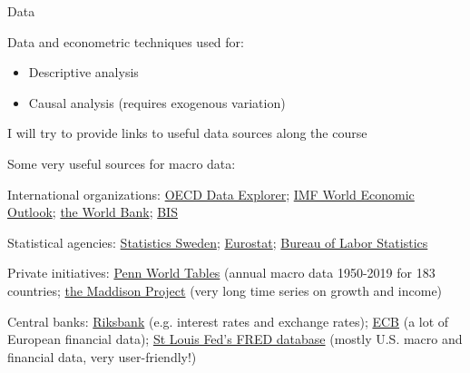 \documentclass[10pt,handout]{beamer}
\begin{document}
\begin{frame}{Data}
\begin{itemize}
    \small{
    \item Data and econometric techniques used for:
    \begin{itemize}
        \item Descriptive analysis\smallskip
        \item Causal analysis (requires exogenous variation)\medskip
    \end{itemize}

    \item I will try to provide links to useful data sources along the course \medskip
    
    \item Some very useful sources for macro data:
    }
    \begin{itemize}
    \footnotesize{
        \item International organizations: \href{https://data-explorer.oecd.org/}{OECD Data Explorer}; \href{https://www.imf.org/en/Publications/SPROLLs/world-economic-outlook-databases}{IMF World Economic Outlook}; \href{https://data.worldbank.org/}{the World Bank}; \href{https://www.bis.org/statistics/dataportal/}{BIS}\smallskip
        \item Statistical agencies: \href{https://www.statistikdatabasen.scb.se/pxweb/en/ssd/}{Statistics Sweden}; \href{https://ec.europa.eu/eurostat/data/database}{Eurostat}; \href{https://www.bls.gov/data/}{Bureau of Labor Statistics} \smallskip
        \item Private initiatives: \href{https://www.rug.nl/ggdc/productivity/pwt/}{Penn World Tables} (annual macro data 1950-2019 for 183 countries; \href{https://www.rug.nl/ggdc/historicaldevelopment/maddison/releases/maddison-project-database-2023}{the Maddison Project} (very long time series on growth and income)  \smallskip
        \item Central banks: \href{https://www.riksbank.se/en-gb/statistics/}{Riksbank} (e.g. interest rates and exchange rates); \href{https://data.ecb.europa.eu/data/datasets}{ECB} (a lot of European financial data); \href{https://fred.stlouisfed.org}{St Louis Fed's FRED database} (mostly U.S. macro and financial data, very user-friendly!)
        }
    \end{itemize}
\end{itemize}
\end{frame}
\end{document}
